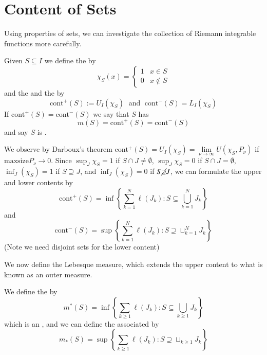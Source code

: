 \section{Content of Sets}

Using properties of sets, we can investigate the collection of Riemann integrable functions more carefully.

\begin{definition}
    Given $S \subseteq I$ we define the  by \begin{equation*}
        \chi_S(x) = \left\{\begin{array}{cc} 1 & x \in S \\ 0 & x \notin S \end{array}\right.
    \end{equation*}
    and the  and the  by \begin{equation*}
        \text{cont}^+(S) := U_I(\chi_S)\;\text{ and }\;\text{cont}^-(S) = L_I(\chi_S)
    \end{equation*}
    If $\text{cont}^+(S) = \text{cont}^-(S)$ we say that $S$ has  $$m(S) = \text{cont}^+(S) = \text{cont}^-(S)$$ and say $S$ is .
\end{definition}

We observe by Darboux's theorem $\text{cont}^+(S) = U_I(\chi_S) = \lim\limits_{\nu\rightarrow \infty}U(\chi_S,P_{\nu})$ if $\text{maxsize}P_{\nu}\rightarrow 0$. Since $\sup_{J}\chi_S = 1$ if $S \cap J \neq \emptyset$, $\sup_{J}\chi_S = 0$ if $S\cap J = \emptyset$, $\inf_J(\chi_S) = 1$ if $S \supseteq J$, and $\inf_J(\chi_S) = 0$ if $S \cancel{\supseteq} J$, we can formulate the upper and lower contents by $$\text{cont}^+(S) = \inf\left\{\sum_{k=1}^N\ell(J_k):S \subseteq \bigcup_{k=1}^NJ_k\right\}$$ and $$\text{cont}^-(S) = \sup\left\{\sum_{k=1}^N\ell(J_k):S \supseteq \sqcup_{k=1}^NJ_k\right\}$$ (Note we need disjoint sets for the lower content)

We now define the Lebesque measure, which extends the upper content to what is known as an outer measure.


\begin{definition}
    We define the  by $$m^*(S) = \inf\left\{\sum_{k\geq 1}\ell(J_k): S\subseteq \bigcup_{k\geq 1}J_k\right\}$$ which is an , and we can define the associated  by $$m_*(S) = \sup\left\{\sum_{k\geq 1}\ell(J_k):S\supseteq \sqcup_{k\geq 1}J_k\right\}$$
\end{definition}

